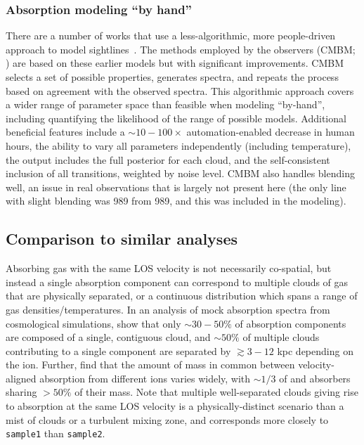\documentclass[fleqn,usenatbib]{mnras}
\begin{document}
\subsubsection{Absorption modeling ``by hand''}

There are a number of works that use a less-algorithmic, more people-driven approach to model sightlines~\citep[e.g.][]{churchill1999Multiple, charlton2000anticipating, charlton2003high, ding2003quadruple, ding2003multiphase, ding2005absorption, zonak2004absorption, masiero2005models, lynch2007physical, misawa2008supersolar, lacki2010z, jones2010Bare, muzahid2015Extreme, richter2018New, rosenwasser2018understanding, norris2021Discovery}.
The methods employed by the observers (CMBM; \citealt{sameer2021Cloudbycloud, sameer2022Probing}) are based on these earlier models but with significant improvements.
CMBM selects a set of possible properties, generates spectra, and repeats the process based on agreement with the observed spectra.
This algorithmic approach covers a wider range of parameter space than feasible when modeling ``by-hand'', including quantifying the likelihood of the range of possible models.
Additional beneficial features include
a $\sim 10-100 \times$ automation-enabled decrease in human hours,
the ability to vary all parameters independently (including temperature),
the output includes the full posterior for each cloud,
and the self-consistent inclusion of all transitions, weighted by noise level.
CMBM also handles blending well, an issue in real observations that is largely not present here
(the only line with slight blending was  989 from  989, and this was included in the modeling).

\subsection{Comparison to similar analyses}

Absorbing gas with the same LOS velocity is not necessarily co-spatial, but instead a single absorption component can correspond to multiple clouds of gas that are physically separated, or a continuous distribution which spans a range of gas densities/temperatures. 
In an analysis of mock absorption spectra from cosmological simulations, \cite{marra2022Examining} show that only $\sim 30-50\%$ of absorption components are composed of a single, contiguous cloud, and $\sim 50\%$ of multiple clouds contributing to a single component are separated by $\gtrsim 3-12$ kpc depending on the ion.
Further, \cite{marra2022Examining} find that the amount of mass in common between velocity-aligned absorption from different ions varies widely, with $\sim 1/3$ of  and  absorbers sharing $>50\%$ of their mass.
Note that multiple well-separated clouds giving rise to absorption at the same LOS velocity is a physically-distinct scenario than a mist of clouds or a turbulent mixing zone, and corresponds more closely to \texttt{sample1} than \texttt{sample2}.
\end{document}
